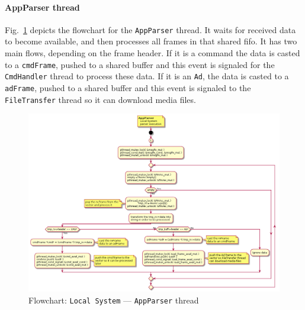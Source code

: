 \paragraph{AppParser thread}
Fig.~\ref{fig:flow-local-app-parser} depicts the flowchart for the \texttt{AppParser}
thread.
It waits for received data to become available, and then processes all frames in
that shared \gls{fifo}.
It has two main flows, depending on the frame header. If it is a command the
data is casted to a \texttt{cmdFrame}, pushed to a shared buffer and this event
is signaled for the \texttt{CmdHandler} thread to process these data. If it is
an \texttt{Ad}, the data is casted to a \texttt{adFrame}, pushed to a shared
buffer and this event is signaled to the \texttt{FileTransfer} thread so it can
download media files.
%
\begin{figure}[htb!]
\centering
    \includegraphics[width=1.0\columnwidth]{./img/flow-local-app-parser.png}
  \caption{Flowchart: \texttt{Local System} --- \texttt{AppParser} thread}%
\label{fig:flow-local-app-parser}
\end{figure}
% 
